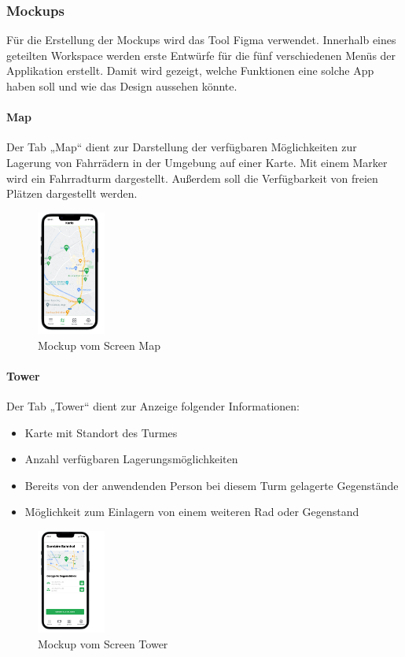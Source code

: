 \subsubsection{Mockups}
Für die Erstellung der Mockups wird das Tool Figma verwendet. Innerhalb eines geteilten Workspace werden erste Entwürfe für die fünf verschiedenen Menüs der Applikation erstellt. Damit wird gezeigt, welche Funktionen eine solche App haben soll und wie das Design aussehen könnte.\\

\paragraph{Map}Der Tab „Map“ dient zur Darstellung der verfügbaren Möglichkeiten zur Lagerung von Fahrrädern in der Umgebung auf einer Karte. Mit einem Marker wird ein Fahrradturm dargestellt. Außerdem soll die Verfügbarkeit von freien Plätzen dargestellt werden.\\
\begin{figure}[H]
  \centering
  \includegraphics[width=0.2\textwidth]{images/app_mock_map}
  \caption{Mockup vom Screen Map}
  \label{fig:screenmapmock}
\end{figure}

\paragraph{Tower}Der Tab „Tower“ dient zur Anzeige folgender Informationen:\\
\begin{itemize}
  \item Karte mit Standort des Turmes
  \item Anzahl verfügbaren Lagerungsmöglichkeiten
  \item Bereits von der anwendenden Person bei diesem Turm gelagerte Gegenstände
  \item Möglichkeit zum Einlagern von einem weiteren Rad oder Gegenstand
\end{itemize}
\begin{figure}[H]
  \centering
  \includegraphics[width=0.2\textwidth]{images/app_mock_tower}
  \caption{Mockup vom Screen Tower}
  \label{fig:screentowermock}
\end{figure}

